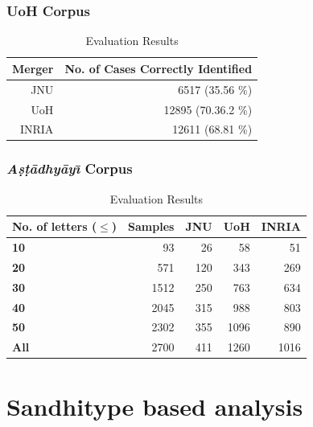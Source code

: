 \documentclass[11pt]{article}
\begin{document}
\subsubsection{UoH Corpus}

\begin{table}[h]
	\begin{center}
		\begin{tabular}{| r | r | }
			\hline  \bf Merger & \bf No. of Cases Correctly Identified \\
			\hline
			JNU & 6517 (35.56 \%) \\
			UoH & 12895 (70.36.2 \%) \\
			INRIA & 12611 (68.81 \%)\\
			\hline
		\end{tabular}
	\end{center}
	\caption{\label{font-table} Evaluation Results }
\end{table}


\subsubsection{\textit{A\d{s}\d{t}\={a}dhy\={a}y\={\i}} Corpus}

\begin{table}[h]
	\begin{center}
		\begin{tabular}{ p{2cm}  r r r r }
			\hline  
			\bf No. of letters ($\le$) & Samples & JNU & UoH & INRIA\\
			\hline
			\bf	10	&	93	&	26	&	58	&	51	\\
			\bf	20	&	571	&	120	&	343	&	269	\\
			\bf	30	&	1512	&	250	&	763	&	634	\\
			\bf	40	&	2045	&	315	&	988	&	803	\\
			\bf	50	&	2302	&	355	&	1096	&	890	\\
			\bf	All	&	2700	&	411	&	1260	&	1016	\\
			\hline
		\end{tabular}
	\end{center}
	\caption{\label{font-table} Evaluation Results }
\end{table}

\section{Sandhitype based analysis}
\end{document}
